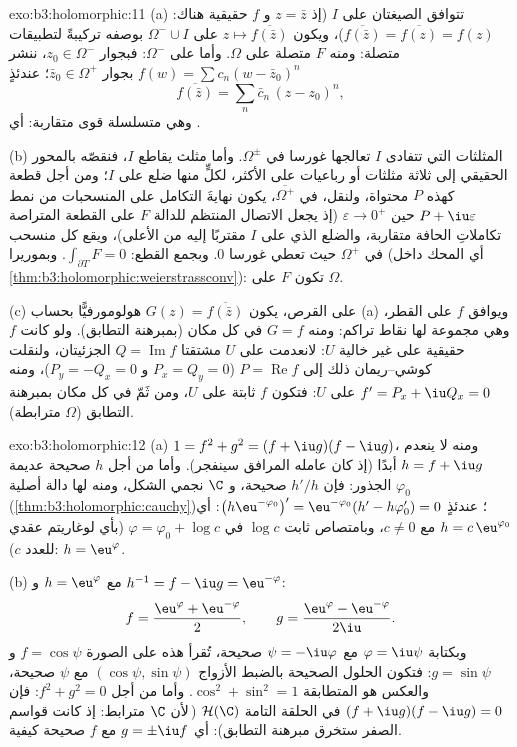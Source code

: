 \begin{solution}{exo:b3:holomorphic:11}
(a) تتوافق الصيغتان على $I$ (إذ $z = \bar z$ و $f$ حقيقية هناك:
$\overline{f(\bar z)} = \overline{f(z)} = f(z)$)، ويكون $z \mapsto \overline{f(\bar z)}$  على $\Omega^-\cup I$ بوصفه تركيبةً
لتطبيقات متصلة: ومنه $F$ متصلة على $\Omega$. وأما 
على $\Omega^-$: فبجوار $z_0
\in \Omega^-$، ننشر $f(w) = \sum c_n(w - \bar z_0)^n$ بجوار $\bar z_0 \in \Omega^+$؛ عندئذٍ
\[
\overline{f(\bar z)} = \sum_n\bar c_n\,(z - z_0)^n,
\]
وهي متسلسلة قوى متقاربة: أي .

(b) المثلثات التي تتفادى $I$ تعالجها غورسا في $\Omega^\pm$.
وأما مثلث يقاطع $I$، فنقصّه بالمحور الحقيقي إلى ثلاثة مثلثات أو
رباعيات على الأكثر، لكلٍّ منها ضلع على $I$؛ ومن أجل قطعة كهذه
$P$ محتواة، ولنقل، في $\overline{\Omega^+}$، يكون  نهايةَ التكامل
على المنسحبات من نمط $P + \iu
\varepsilon$ حين $\varepsilon \to 0^+$ (إذ يجعل الاتصال المنتظم
للدالة $F$ على القطعة المتراصة تكاملاتِ الحافة متقاربة، والضلع
الذي على $I$ مقتربًا إليه من الأعلى)، ويقع كل منسحب في
$\Omega^+$ حيث تعطي غورسا $0$. وبجمع القطع: $\int_{\partial T}F = 0$. وبموريرا
(أي المحك داخل \cref{thm:b3:holomorphic:weierstrassconv}): تكون $F$  على
$\Omega$.

(c) على القرص، يكون $G(z) = \overline{f(\bar z)}$ هولومورفيًّا بحساب (a) ويوافق $f$
على القطر، وهي مجموعة لها نقاط تراكم: ومنه $G = f$ في كل مكان
(بمبرهنة التطابق). ولو كانت $f$ حقيقية على  غير
خالية $U$: لانعدمت على $U$ مشتقتا $Q = \operatorname{Im}f$ الجزئيتان، ولنقلت
كوشي--ريمان ذلك إلى $P =
\operatorname{Re}f$ ($P_x = Q_y = 0$ و $P_y = -Q_x = 0$)،
ومنه $f' = P_x + \iu Q_x = 0$ على $U$: فتكون $f$ ثابتة على $U$، ومن ثَمّ في كل
مكان بمبرهنة التطابق ($\Omega$ مترابطة).
\end{solution}

\begin{solution}{exo:b3:holomorphic:12}
(a) $1 = f^2 + g^2 = (f + \iu g)(f - \iu g)$، ومنه لا ينعدم $h = f +
\iu g$ أبدًا (إذ كان عامله المرافق
سينفجر). وأما من أجل $h$ صحيحة عديمة الجذور: فإن $h'/h$ صحيحة،
و $\C$ نجمي الشكل، ومنه لها دالة أصلية $\varphi_0$
(\cref{thm:b3:holomorphic:cauchy})؛ عندئذٍ $\bigl(h\eu^{-\varphi_0}\bigr)' = \eu^{-\varphi_0}(h' -
h\varphi_0') = 0$: أي $h = c\,\eu^{\varphi_0}$ مع $c \neq 0$، وبامتصاص
ثابت $\log c$ في $\varphi = \varphi_0
+ \log c$ (بأي لوغاريتم عقدي للعدد $c$): $h =
\eu^{\varphi}$.

(b) مع $h = \eu^{\varphi}$ و $h^{-1} = f - \iu g =
\eu^{-\varphi}$:
\[
f = \frac{\eu^{\varphi} + \eu^{-\varphi}}2,
\qquad
g = \frac{\eu^{\varphi} - \eu^{-\varphi}}{2\iu} .
\]
وبكتابة $\varphi = \iu\psi$ مع $\psi = -\iu\varphi$ صحيحة، تُقرأ هذه على الصورة
$f = \cos\psi$ و $g = \sin\psi$: فتكون الحلول الصحيحة بالضبط
الأزواج $(\cos\psi,
\sin\psi)$ مع $\psi$ صحيحة، والعكس هو المتطابقة $\cos^2 + \sin^2 = 1$.
وأما من أجل $f^2 + g^2 = 0$: فإن $(f + \iu g)(f - \iu g) = 0$ في الحلقة التامة
$\mathcal H(\C)$ (\,لأن $\C$ مترابط: إذ كانت قواسم الصفر ستخرق
مبرهنة التطابق): أي $g = \pm\iu
f$ مع $f$ صحيحة كيفية.
\end{solution}

